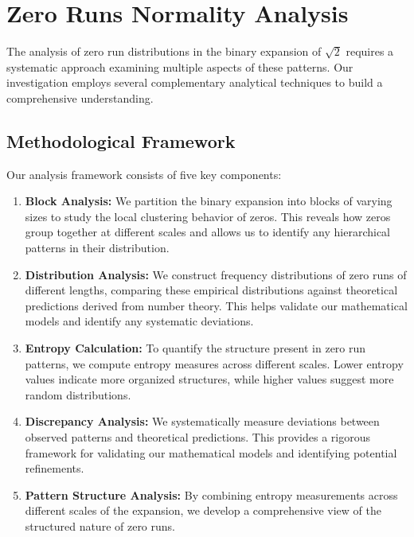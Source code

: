 \section{Zero Runs Normality Analysis}

The analysis of zero run distributions in the binary expansion of $\sqrt{2}$ requires a systematic approach examining multiple aspects of these patterns. Our investigation employs several complementary analytical techniques to build a comprehensive understanding.

\subsection{Methodological Framework}

Our analysis framework consists of five key components:

\begin{enumerate}
    \item \textbf{Block Analysis:} We partition the binary expansion into blocks of varying sizes to study the local clustering behavior of zeros. This reveals how zeros group together at different scales and allows us to identify any hierarchical patterns in their distribution.
    
    \item \textbf{Distribution Analysis:} We construct frequency distributions of zero runs of different lengths, comparing these empirical distributions against theoretical predictions derived from number theory. This helps validate our mathematical models and identify any systematic deviations.
    
    \item \textbf{Entropy Calculation:} To quantify the structure present in zero run patterns, we compute entropy measures across different scales. Lower entropy values indicate more organized structures, while higher values suggest more random distributions.
    
    \item \textbf{Discrepancy Analysis:} We systematically measure deviations between observed patterns and theoretical predictions. This provides a rigorous framework for validating our mathematical models and identifying potential refinements.
    
    \item \textbf{Pattern Structure Analysis:} By combining entropy measurements across different scales of the expansion, we develop a comprehensive view of the structured nature of zero runs.
\end{enumerate}

